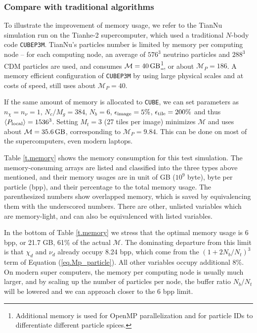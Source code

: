 \documentclass[10pt,twocolumn,preprint]{emulateapj}
\begin{document}
\subsubsection{Compare with traditional algorithms}
To illustrate the improvement of memory usage, we refer to the TianNu simulation \citep{2017NatAs...1E.143Y} run on the Tianhe-2 supercomputer, which used a traditional $N$-body code {\tt CUBEP3M}. TianNu's particles number is limited by memory per computing node -- for each computing node, an average of $576^3$ neutrino particles and $288^3$ CDM particles are used, and consumes $\mathcal{M}=40\,{\rm GB}$\footnote{Additional memory is used for OpenMP parallelization and for particle IDs to differentiate different particle spices.}, or about $\mathcal{M}_P=186$. A memory efficient configuration of {\tt CUBEP3M} by using large physical scales and at costs of speed, still uses about $\mathcal{M}_P=40$. 

If the same amount of memory is allocated to {\tt CUBE}, we can set parameters as $n_\chi=n_\nu=1$, $N_c/M_g=384$, $N_b=6$, $\epsilon_{\rm image}=5\%$, $\epsilon_{\rm tile}=200\%$ and thus $\left\langle P_{\rm local}\right\rangle=1536^3$. Setting $M_t=3$ (27 tiles per image) minimizes $\mathcal{M}$ and uses about $\mathcal{M}=35.6\,{\rm GB}$, corresponding to $\mathcal{M}_P=9.84$. This can be done on most of the supercomputers, even modern laptops.

Table \ref{t.memory} shows the memory consumption for this test simulation. The memory-consuming arrays are listed and classified into the three types above mentioned, and their memory usages are in unit of GB ($10^9$ byte), byte per particle (bpp), and their percentage to the total memory usage. The parenthesized numbers show overlapped memory, which is saved by equivalencing them with the underscored numbers. There are other, unlisted variables which are memory-light, and can also be equivalenced with listed variables.

In the bottom of Table \ref{t.memory} we stress that the optimal memory usage is 6 bpp, or 21.7 GB, 61\% of the actual $\mathcal{M}$. The dominating departure from this limit is that $\chi_d$ and $\nu_d$ already occupy 8.24 bpp, which come from the $(1+2N_b/N_t)^3$ term of Equation (\ref{eq.Mp_particle}). All other variables occupy additional 8\%. On modern super computers, the memory per computing node is usually much larger, and by scaling up the number of particles per node, the buffer ratio $N_b/N_t$ will be lowered and we can approach closer to the 6 bpp limit.
\end{document}
